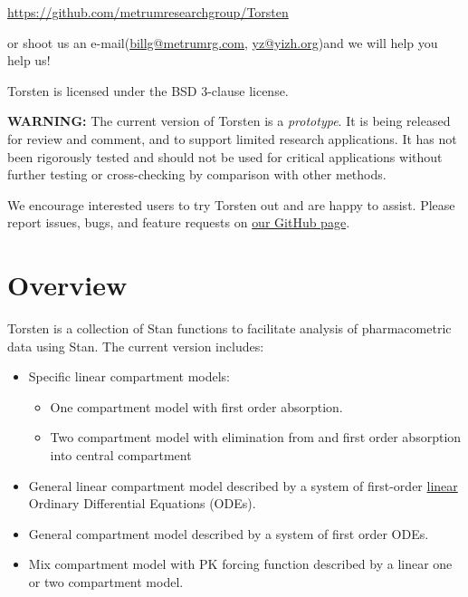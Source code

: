 \documentclass[10pt, reqno, oneside]{amsbook}
\numberwithin{equation}{chapter}
\numberwithin{figure}{chapter}
\numberwithin{table}{chapter}
\theoremstyle{remark}
\begin{document}
\href{https://github.com/metrumresearchgroup/Torsten}{https://github.com/metrumresearchgroup/Torsten} 

or shoot us an
e-mail(\href{mailto:billg@metrumrg.com}{billg@metrumrg.com}, \href{mailto:yz@yizh.org}{yz@yizh.org})and we will help you help us!

Torsten is licensed under the BSD 3-clause license.

\begin{mdframed}
\textbf{WARNING:} The current version of Torsten is a \emph{prototype}. It
is being released for review and comment, and to support limited
research applications. It has not been rigorously tested and should
not be used for critical applications without further testing or
cross-checking by comparison with other methods.

We encourage interested users to try Torsten out and are happy to
assist. Please report issues, bugs, and feature requests on
\href{https://github.com/metrumresearchgroup/stan}{our GitHub page}.
\end{mdframed}

\section{Overview}
\label{overview}
Torsten is a collection of Stan functions to facilitate analysis of
pharmacometric data using Stan. The current version
includes:
\begin{itemize}
\item Specific linear compartment models:
\begin{itemize}
\item One compartment model with first order absorption.
\item Two compartment model with elimination from and first order absorption into central compartment
\end{itemize}
\item General linear compartment model described by a system of first-order \underline{linear} Ordinary Differential Equations (ODEs).
\item General compartment model described by a system of first order ODEs.
\item Mix compartment model with PK forcing function described by a linear one or two compartment model.
\end{itemize}
\end{document}
